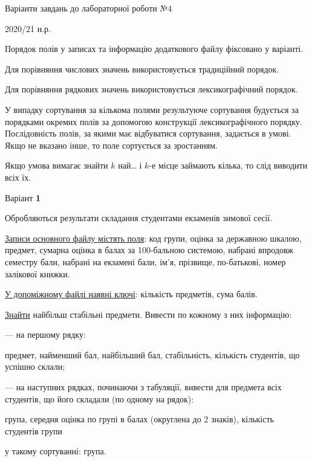 \documentclass[11pt, ukrainian]{article}
\begin{document}
{\Large \center  Варіанти завдань до лабораторної роботи №4\par 2020/21 н.р.\par \bigskip\bigskip}

Порядок полів у записах та інформацію додаткового файлу фіксовано у варіанті.

Для порівняння числових значень використовується традиційний порядок.

Для порівняння рядкових значень використовується лексикографічний порядок. 

У випадку сортування за кількома полями результуюче сортування будується 
за порядками окремих полів за допомогою конструкції лексикографічного порядку. 
Послідовність полів, за якими має відбуватися сортування, задається в умові. 
Якщо не вказано інше, то поле сортується за зростанням.

Якщо умова вимагає знайти $k$ най… і $k$-е місце займають кілька, то слід виводити всіх їх.

\newpage
\par \bigskip

{\center Варіант  \No \textbf { 1 }\par}
\bigskip
Обробляються результати складання студентами екзаменів зимової сесії.

\underline{Записи основного файлу містять поля}: код групи, оцінка за державною шкалою, предмет, сумарна оцінка в балах за 100-бальною системою, набрані впродовж семестру бали, набрані на екзамені бали, ім’я, прізвище, по-батькові, номер залікової книжки.

\underline{У допоміжному файлі наявні ключі}: кількість предметів, сума балів.

\underline{Знайти} найбільш стабільні предмети. Вивести по кожному з них інформацію:\par
{\noindent}--- на першому рядку:\par
предмет, найменший бал, найбільший бал, стабільність, кількість студентів, що успішно склали;

{\noindent}--- на наступних рядках, починаючи з табуляції, вивести для предмета всіх студентів, що його складали (по одному на рядок):\par
група, середня оцінка по групі в балах (округлена до 2 знаків), кількість студентів групи

{\noindent}у такому сортуванні: група.

\end{document}
